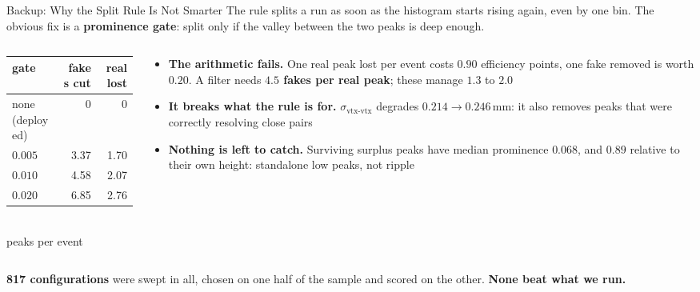 \documentclass[xcolor=table,aspectratio=169]{beamer}
\begin{document}
\begin{frame}{Backup: Why the Split Rule Is Not Smarter}
    \small
    The rule splits a run as soon as the histogram starts rising again, even by one
    bin. The obvious fix is a \textbf{prominence gate}: split only if the valley between
    the two peaks is deep enough.
    \vspace{0.5em}

    \begin{columns}[t]
        \begin{column}{0.42\linewidth}
            \centering
            \scriptsize
            \setlength{\tabcolsep}{5pt}
            \begin{tabular}{l rr}
                \toprule
                gate & fakes cut & real lost \\
                \midrule
                none \textcolor{black!55}{(deployed)} & 0 & 0 \\
                $0.005$ & 3.37 & 1.70 \\
                $0.010$ & 4.58 & 2.07 \\
                $0.020$ & 6.85 & 2.76 \\
                \bottomrule
            \end{tabular}\\[0.3em]
            {\scriptsize\textcolor{black!55}{peaks per event}}
        \end{column}
        \begin{column}{0.58\linewidth}
            \footnotesize
            \begin{itemize}\setlength\itemsep{0.35em}
                \item \textbf{The arithmetic fails.} One real peak lost per event costs
                    $0.90$ efficiency points, one fake removed is worth $0.20$. A filter
                    needs \textbf{$4.5$ fakes per real peak}; these manage $1.3$ to
                    $2.0$
                \item \textbf{It breaks what the rule is for.}
                    $\sigma_{\text{vtx-vtx}}$ degrades $0.214 \to 0.246$\,mm: it also
                    removes peaks that were correctly resolving close pairs
                \item \textbf{Nothing is left to catch.} Surviving surplus peaks have
                    median prominence $0.068$, and $0.89$ relative to their own height:
                    standalone low peaks, not ripple
            \end{itemize}
        \end{column}
    \end{columns}

    \vspace{0.4em}
    \centering
    {\footnotesize\textcolor{black!65}{\textbf{817 configurations} were swept in all,
    chosen on one half of the sample and scored on the other.
    \textbf{None beat what we run.}}}
\end{frame}
\end{document}
